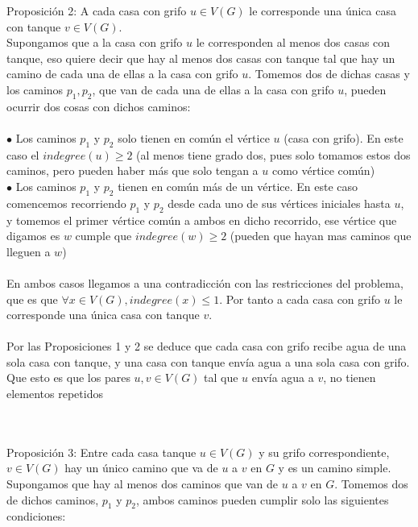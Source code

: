 \documentclass{article}
\begin{document}
    Proposici\'on 2: A cada casa con grifo $u \in V(G)$ le corresponde una \'unica casa con tanque $v \in V(G)$.\\

    Supongamos que a la casa con grifo $u$ le corresponden al menos dos casas con tanque, eso quiere decir que hay al menos dos casas
    con tanque tal que hay un camino de cada una de ellas a la casa con grifo $u$. Tomemos dos de dichas casas y los caminos $p_1, p_2$,
     que van de cada una de ellas a la casa con grifo $u$, pueden ocurrir dos cosas con dichos caminos:\\\\

    $\bullet$ Los caminos $p_1$ y $p_2$ solo tienen en com\'un el v\'ertice $u$ (casa con grifo). En este caso
    el $indegree(u) \geq 2$ (al menos tiene grado dos, pues solo tomamos estos dos caminos, pero pueden haber m\'as que
    solo tengan a $u$ como v\'ertice com\'un)\\
 
    $\bullet$ Los caminos $p_1$ y $p_2$ tienen en com\'un m\'as de un v\'ertice. En este caso comencemos recorriendo $p_1$ y $p_2$ desde cada
    uno de sus v\'ertices iniciales hasta $u$, y tomemos el primer v\'ertice com\'un a ambos en dicho recorrido, ese v\'ertice que digamos es $w$
    cumple que $indegree(w) \geq 2$ (pueden que hayan mas caminos que lleguen a $w$)\\\\

    En ambos casos llegamos a una contradicci\'on con las restricciones del problema, que es que $\forall x \in V(G), indegree(x) \leq 1$. 
    Por tanto a cada casa con grifo $u$ le corresponde una \'unica casa con tanque $v$.\\\\

    Por las Proposiciones 1 y 2 se deduce que cada casa con grifo recibe agua de una sola casa con tanque, y una casa con tanque env\'ia agua a
    una sola casa con grifo. Que esto es que los pares $u,v \in V(G)$ tal que $u$ env\'ia agua a $v$, no tienen elementos repetidos\\\\\

    Proposici\'on 3: Entre cada casa tanque $u \in V(G)$ y su grifo correspondiente, $v \in V(G)$ hay un \'unico camino
    que va de $u$ a $v$ en $G$ y es un camino simple.\\

    Supongamos que hay al menos dos caminos que van de $u$ a $v$ en $G$. Tomemos dos de dichos caminos, $p_1$ y $p_2$, ambos caminos pueden cumplir solo las 
    siguientes condiciones:\\\\
\end{document}
